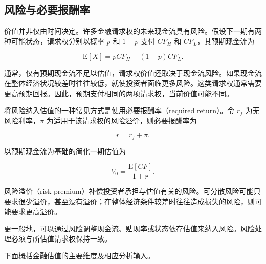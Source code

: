 \subsection{风险与必要报酬率}

价值并非仅由时间决定。许多金融请求权的未来现金流具有风险。假设下一期有两种可能状态，请求权分别以概率 $p$ 和 $1-p$ 支付 $CF_H$ 和 $CF_L$，其预期现金流为

\begin{equation}
\mathrm{E}[X]=pCF_H+(1-p)CF_L.
\label{eq:ch5-expected-cash-flow}
\end{equation}

通常，仅有预期现金流不足以估值，请求权价值还取决于现金流风险。如果现金流在整体经济状况较差时往往较低，就使投资者面临更多风险。这类请求权通常需要更高预期回报。因此，预期支付相同的两项请求权，当前价值可能不同。

将风险纳入估值的一种常见方式是使用必要报酬率（required return）。令 $r_f$ 为无风险利率，$\pi$ 为适用于该请求权的风险溢价，则必要报酬率为

\begin{equation}
r=r_f+\pi.
\label{eq:ch5-required-return}
\end{equation}

以预期现金流为基础的简化一期估值为

\begin{equation}
V_0=\frac{\mathrm{E}[CF]}{1+r}.
\label{eq:ch5-risk-adjusted-discount}
\end{equation}

风险溢价（risk premium）补偿投资者承担与估值有关的风险。可分散风险可能只要求很少溢价，甚至没有溢价；在整体经济条件较差时往往造成损失的风险，则可能要求更高溢价。

更一般地，可以通过风险调整现金流、贴现率或状态依存估值来纳入风险。风险处理必须与所估值请求权保持一致。

\medskip

下面概括金融估值的主要维度及相应分析输入。

